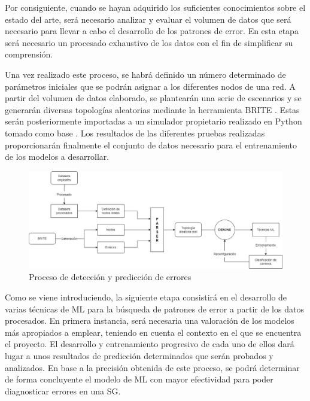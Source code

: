 \vspace{0.3cm}

Por consiguiente, cuando se hayan adquirido los suficientes conocimientos sobre el estado del arte, será necesario analizar y evaluar el volumen de datos que será necesario para llevar a cabo el desarrollo de los patrones de error. En esta etapa será necesario un procesado exhaustivo de los datos con el fin de simplificar su comprensión.

\vspace{0.3cm}

Una vez realizado este proceso, se habrá definido un número determinado de parámetros iniciales que se podrán asignar a los diferentes nodos de una red. A partir del volumen de datos elaborado, se plantearán una serie de escenarios y se generarán diversas topologías aleatorias mediante la herramienta BRITE \cite{brite}. Estas serán posteriormente importadas a un simulador propietario realizado en Python  tomado como base \cite{gitden2ne}. Los resultados de las diferentes pruebas realizadas proporcionarán finalmente el conjunto de datos necesario para el entrenamiento de los modelos a desarrollar.

\vspace{0.5cm}

\begin{figure}[!htb]
  \centering
  \includegraphics[width=1\textwidth]{img/imagen.drawio.png}
  \caption{Proceso de detección y predicción de errores}
  \label{fig:1}
\end{figure}

\vspace{0.3cm}

Como se viene introduciendo, la siguiente etapa consistirá en el desarrollo de varias técnicas de ML para la búsqueda de patrones de error a partir de los datos procesados. En primera instancia, será necesaria una valoración de los modelos más apropiados a emplear, teniendo en cuenta el contexto en el que se encuentra el proyecto. El desarrollo y entrenamiento progresivo de cada uno de ellos dará lugar a unos resultados de predicción determinados que serán probados y analizados. En base a la precisión obtenida de este proceso, se podrá determinar de forma concluyente el modelo de ML con mayor efectividad para poder diagnosticar errores en una SG. 

